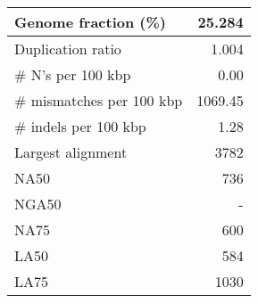 \documentclass[12pt,a4paper]{article}
\begin{document}
\begin{table}[ht]
\begin{center}
\begin{tabular}{|l*{1}{|r}|}
Genome fraction (\%) & 25.284 \\ \hline
Duplication ratio & 1.004 \\ \hline
\# N's per 100 kbp & 0.00 \\ \hline
\# mismatches per 100 kbp & 1069.45 \\ \hline
\# indels per 100 kbp & 1.28 \\ \hline
Largest alignment & 3782 \\ \hline
NA50 & 736 \\ \hline
NGA50 & - \\ \hline
NA75 & 600 \\ \hline
LA50 & 584 \\ \hline
LA75 & 1030 \\ \hline
\end{tabular}
\end{center}
\end{table}
\end{document}
